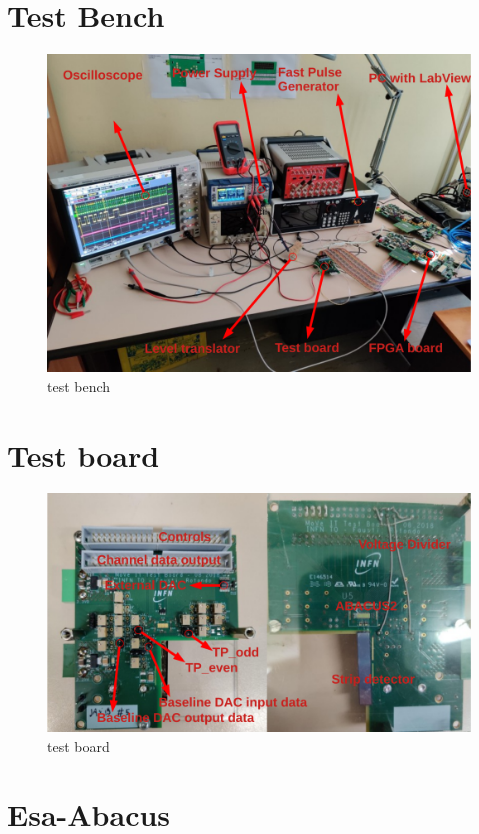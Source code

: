 \section{Test Bench}\label{testbench}
\begin{figure}[H]
	\centering
	\includegraphics[width=0.7\linewidth]{IMG/ch5/TESTBENCH}
	\caption{test bench}
	\label{fig:testbench}
\end{figure}

\section{Test board}\label{testboard}
\begin{figure}[H]
	\centering
	\includegraphics[width=0.7\linewidth]{IMG/ch5/TESTBOARD}
	\caption{test board}
	\label{fig:testboard}
\end{figure}

\section{Esa-Abacus}